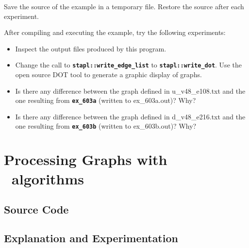 \documentclass{report}
\begin{document}
Save the source of the example in a temporary file.
Restore the source after each experiment.

After compiling and executing the example, try the following experiments:
\begin{itemize}
\item
Inspect the output files produced by this program.
\item
Change the call to \texttt{{\bf stapl::write\_edge\_list}} to
\texttt{{\bf stapl::write\_dot}}.  Use the open source DOT tool to generate
a graphic display of graphs.
\item Is there any difference between the graph defined in u\_v48\_e108.txt and
the one resulting from \texttt{\bf ex\_603a} (written to ex\_603a.out)? Why?
\item Is there any difference between the graph defined in d\_v48\_e216.txt and
the one resulting from \texttt{\bf ex\_603b} (written to ex\_603b.out)? Why?
\end{itemize}


\pagebreak
\section{Processing Graphs with \stapl\ algorithms}

\subsection{Source Code}



\subsection{Explanation and Experimentation}
\end{document}
